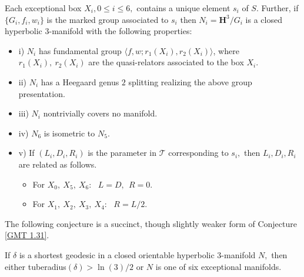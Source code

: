\begin{conjecture}\label{GMT 1.31}
Each  exceptional 
box $X_i, 0\le i\le 6,$ contains a unique element $s_i$ of $S.$
Further{\textrm ,} if $\{G_i, f_i, w_i\}$ is the marked group
associated to $s_i$ then
$N_i = \mathbf {H}^3/G_i$ is a closed hyperbolic $3$\/{\textrm -}\/manifold
with the following properties\/{\textrm :}
\begin{itemize}
\item{i)} $N_i$ has fundamental group
$\langle f,w;r_1(X_i),r_2(X_i)\rangle${\textrm ,}
where $r_1(X_i),\ r_2(X_i)$ are the quasi\/{\textrm -}\/relators
associated to the box $X_i.$
\item{ii)}  $N_i$ has a Heegaard genus $2$ splitting realizing the above group presentation.

\item{iii)} $N_i$ nontrivially covers no manifold.  

\item{iv)} $N_6$ is isometric to $N_5.$
 
\item{v)} If $(L_i, D_i, R_i)$ is the parameter in $\mathcal {T}$
corresponding to $s_i,$ then $L_i, D_i, R_i$ are related as follows.
\begin{itemize}
\item[] For $X_0,\ X_5,\ X_6:\ \ \ L=D, \ \ R=0.$  

\item[] For $X_1,\ X_2,\ X_3,\ X_4:\ \ \ R=L/2.$
\end{itemize}
\end{itemize}
\end{conjecture}

The following conjecture is a succinct, though slightly weaker
form of Conjecture \ref{GMT 1.31}.

\begin{conjecture}\label{GMT 1.33}
  If $\delta$ is a shortest geodesic in a closed
orientable hyperbolic $3$\/{\textrm -}\/manifold $N,$ then either 
tuberadius$(\delta) > \ln(3)/2$
or $N$ is one of six exceptional manifolds.
\end{conjecture}

